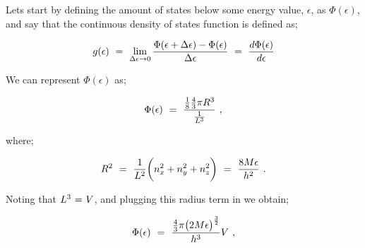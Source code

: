 \documentclass{article}
\begin{document}
Lets start by defining the amount of states below some energy value, \begin{math} \epsilon \end{math}, as \begin{math} \Phi ( \epsilon ) \end{math}, and say that the continuous density of states function is defined as;

\begin{equation} \label{eq:256}
g ( \epsilon ) \hspace{0.125cm} = \hspace{0.125cm} \lim_{\Delta \epsilon \rightarrow 0} \frac{ \Phi ( \epsilon + \Delta \epsilon ) - \Phi ( \epsilon )}{\Delta \epsilon} \hspace{0.125cm} = \hspace{0.125cm} \frac{d  \Phi ( \epsilon )}{d \epsilon}
\end{equation}

We can represent \begin{math} \Phi ( \epsilon ) \end{math} as;

\begin{equation} \label{eq:256}
\Phi ( \epsilon ) \hspace{0.125cm} = \hspace{0.125cm} \frac{ \frac{1}{8} \frac{4}{3} \pi R^3}{\frac{1}{L^3}} \hspace{0.125cm} , 
\end{equation}

where;

\begin{equation} \label{eq:256}
R^2 \hspace{0.125cm} = \hspace{0.125cm} \frac{1}{L^2} \bigg( n_x^2 + n_y^2 + n_z^2  \bigg) \hspace{0.125cm} = \hspace{0.125cm} \frac{8 M \epsilon}{h^2} \hspace{0.125cm} . 
\end{equation}

Noting that \begin{math} L^3 \hspace{0.025cm} = \hspace{0.025cm} V \end{math}, and plugging this radius term in we obtain;

\begin{equation} \label{eq:256}
\Phi ( \epsilon ) \hspace{0.125cm} = \hspace{0.125cm} \frac{ \frac{4}{3} \pi \big( 2 M \epsilon \big)^{\frac{3}{2}}}{h^3} V \hspace{0.125cm} , 
\end{equation}
\end{document}
